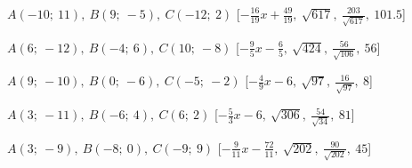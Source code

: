 \begin{esercizio}
\begin{enumeratea}
  \item  $A(-10;~11),~B(9;~-5),~C(-12;~2)$ \hfill 
   [$-\frac{16}{19} x +\frac{49}{19},~\sqrt{617},~\frac{203}{\sqrt{617}},~101.5$]
  \item  $A(6;~-12),~B(-4;~6),~C(10;~-8)$ \hfill 
   [$-\frac{9}{5} x -\frac{6}{5},~\sqrt{424},~\frac{56}{\sqrt{106}},~56$]
  \item  $A(9;~-10),~B(0;~-6),~C(-5;~-2)$ \hfill 
   [$-\frac{4}{9} x -6,~\sqrt{97},~\frac{16}{\sqrt{97}},~8$]
  \item  $A(3;~-11),~B(-6;~4),~C(6;~2)$ \hfill 
   [$-\frac{5}{3} x -6,~\sqrt{306},~\frac{54}{\sqrt{34}},~81$]
  \item  $A(3;~-9),~B(-8;~0),~C(-9;~9)$ \hfill 
   [$-\frac{9}{11} x -\frac{72}{11},~\sqrt{202},~\frac{90}{\sqrt{202}},~45$]
 \end{enumeratea}
\end{esercizio}

